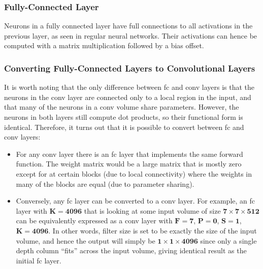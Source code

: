 \subsubsection{Fully-Connected Layer}
Neurons in a fully connected layer have full connections to all activations in
the previous layer, as seen in regular neural networks. Their activations can
hence be computed with a matrix multiplication followed by a bias offset.

\subsubsection{Converting Fully-Connected Layers to Convolutional Layers}
It is worth noting that the only difference between \acrshort{fc} and
\acrshort{conv} layers is that the neurons in the \acrshort{conv} layer are
connected only to a local region in the input, and that many of the neurons in
a \acrshort{conv} volume share parameters. However, the neurons in both layers
still compute dot products, so their functional form is identical. Therefore,
it turns out that it is possible to convert between \acrshort{fc} and
\acrshort{conv} layers:
\begin{itemize}
    \item For any \acrshort{conv} layer there is an \acrshort{fc} layer that
    implements the same forward function. The weight matrix would be a large
    matrix that is mostly zero except for at certain blocks (due to local
    connectivity) where the weights in many of the blocks are equal (due to
    parameter sharing).
    \item Conversely, any \acrshort{fc} layer can be converted to a
    \acrshort{conv} layer. For example, an \acrshort{fc} layer with
    $\boldsymbol{K=4096}$ that is looking at some input volume of size
    $\boldsymbol{7\times7\times512}$ can be equivalently expressed as a
    \acrshort{conv} layer with $\boldsymbol{F=7}$, $\boldsymbol{P=0}$,
    $\boldsymbol{S=1}$, $\boldsymbol{K=4096}$. In other words, filter size is
    set to be exactly the size of the input volume, and hence the output will
    simply be $\boldsymbol{1\times1\times4096}$ since only a single depth
    column ``fits'' across the input volume, giving identical result as the
    initial \acrshort{fc} layer.
\end{itemize}



